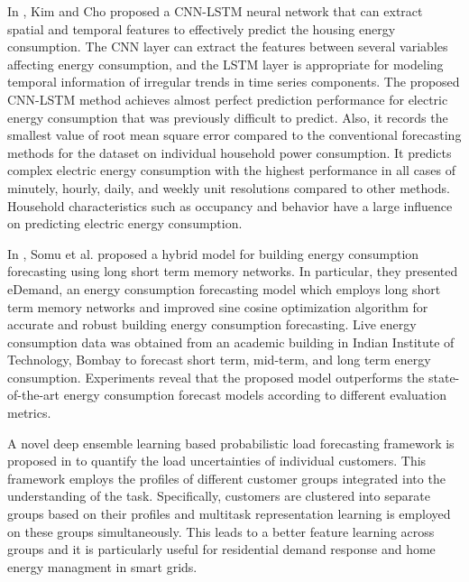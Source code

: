 In \cite{KIM201972}, Kim and Cho proposed a CNN-LSTM neural network that can extract spatial and temporal features to effectively predict the housing energy consumption.
The CNN layer can extract the features between several variables affecting energy consumption, and the LSTM layer is appropriate for modeling temporal information of irregular trends in time series components. The proposed CNN-LSTM method achieves almost perfect prediction performance for electric energy consumption that was previously difficult to predict.
Also, it records the smallest value of root mean square error compared to the conventional forecasting methods for the dataset on individual household power consumption.
It predicts complex electric energy consumption with the highest performance in all cases of minutely, hourly, daily, and weekly unit resolutions compared to other methods.
Household characteristics such as occupancy and behavior have a large influence on predicting electric energy consumption.

In \cite{SOMU2020114131}, Somu et al. proposed a hybrid model for building energy consumption forecasting using long short term memory networks.
In particular, they presented eDemand, an energy consumption forecasting model which employs long short term memory networks and improved sine cosine optimization algorithm for accurate and robust building energy consumption forecasting.
Live energy consumption data was obtained from an academic building in Indian Institute of Technology, Bombay to forecast short term, mid-term, and long term energy consumption.
Experiments reveal that the proposed model outperforms the state-of-the-art energy consumption forecast models according to different evaluation metrics.

A novel deep ensemble learning based probabilistic load forecasting framework is proposed in \cite{YANG2019116324} to quantify the load uncertainties of individual customers.
This framework employs the profiles of different customer groups integrated into the understanding of the task.
Specifically, customers are clustered into separate groups based on their profiles and multitask representation learning is employed on these groups simultaneously.
This leads to a better feature learning across groups and it is particularly useful for residential demand response and home energy managment in smart grids.

